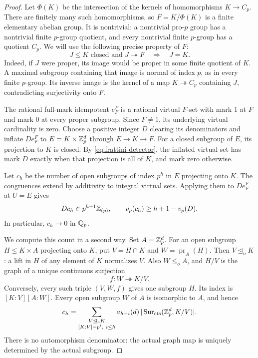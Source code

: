 \begin{proof}
Let $\Phi(K)$ be the intersection of the kernels of homomorphisms
$K\to C_p$.  There are finitely many such homomorphisms, so
$F=K/\Phi(K)$ is a finite elementary abelian group.  It is nontrivial:
a nontrivial pro-$p$ group has a nontrivial finite $p$-group quotient,
and every nontrivial finite $p$-group has a quotient $C_p$.
We will use the following precise property of $F$:
\begin{equation}\label{eq:frattini-detector}
 J\leq K\text{ closed and }J\twoheadrightarrow F
       \quad\Longrightarrow\quad J=K.
\end{equation}
Indeed, if $J$ were proper, its image would be proper in some finite
quotient of $K$.  A maximal subgroup containing that image is normal
of index $p$, as in every finite $p$-group.  Its inverse image is the
kernel of a map $K\twoheadrightarrow C_p$ containing $J$, contradicting
surjectivity onto $F$.

The rational full-mark idempotent $e_F^F$ is a rational virtual $F$-set
with mark $1$ at $F$ and mark $0$ at every proper subgroup.  Since
$F\ne1$, its underlying virtual cardinality is zero.  Choose a positive
integer $D$ clearing its denominators and inflate $De_F^F$ to
$E=K\times\mathbb Z_p^d$ through $E\to K\to F$.
For a closed subgroup of $E$, its projection to $K$ is closed.
By \eqref{eq:frattini-detector}, the inflated virtual set has mark $D$
exactly when that projection is all of $K$, and mark zero otherwise.

Let $c_h$ be the number of open subgroups of index $p^h$ in $E$
projecting onto $K$.  The congruences extend by additivity to integral
virtual sets.  Applying them to $De_F^F$ at $U=E$ gives
\begin{equation}\label{eq:surjective-count-vanishes}
 Dc_h\in p^{h+1}\mathbb Z_{(p)},
 \qquad v_p(c_h)\geq h+1-v_p(D).
\end{equation}
In particular, $c_h\to0$ in $\mathbb Q_p$.

We compute this count in a second way.  Set $A=\mathbb Z_p^d$.
For an open subgroup $H\leq K\times A$ projecting onto $K$, put
$V=H\cap K$ and $W=\operatorname{pr}_A(H)$.
Then $V\trianglelefteq_o K$: a lift in $H$ of any element of $K$
normalizes $V$.  Also $W\leq_o A$, and $H/V$ is the graph of a unique
continuous surjection
\[
 f:W\twoheadrightarrow K/V.
\]
Conversely, every such triple $(V,W,f)$ gives one subgroup $H$.
Its index is $[K:V][A:W]$.  Every open subgroup $W$ of $A$ is
isomorphic to $A$, and hence
\begin{equation}\label{eq:graph-subgroup-count}
 c_h=
 \sum_{\substack{V\trianglelefteq_o K\\{}[K:V]=p^i,\ i\leq h}}
       a_{h-i}(d)\,|\operatorname{Sur}_{\mathrm{cts}}(\mathbb Z_p^d,K/V)|.
\end{equation}
There is no automorphism denominator: the actual graph map is uniquely
determined by the actual subgroup.


\end{proof}
